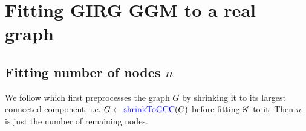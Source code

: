 









\section{Fitting GIRG GGM to a real graph}

\subsection{Fitting number of nodes $n$}

We follow \cite{blasius2018towards} which first preprocesses the graph $G$ by shrinking it to its largest connected component, i.e. $G \gets \operatorname{\textcolor{blue}{shrinkToGCC}}(G)$
before fitting $\mathscr{G}$ to it. Then $n$ is just the number of remaining nodes.



